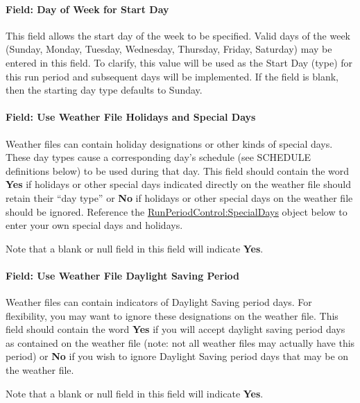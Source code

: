 \paragraph{Field: Day of Week for Start Day}\label{field-day-of-week-for-start-day-3}

This field allows the start day of the week to be specified. Valid days of the week (Sunday, Monday, Tuesday,
Wednesday, Thursday, Friday, Saturday) may be entered in this field. To clarify, this value will be used as
the Start Day (type) for this run period and subsequent days will be implemented. If the field is blank,
then the starting day type defaults to Sunday.

\paragraph{Field: Use Weather File Holidays and Special Days}\label{field-use-weather-file-holidays-and-special-days-1}

Weather files can contain holiday designations or other kinds of special days. These day types cause a
corresponding day's schedule (see SCHEDULE definitions below) to be used during that day. This field
should contain the word \textbf{Yes} if holidays or other special days indicated directly on the weather
file should retain their ``day type'' or \textbf{No} if holidays or other special days on the weather file
should be ignored. Reference the \hyperref[runperiodcontrolspecialdays]{RunPeriodControl:SpecialDays} object below to enter your own special days
and holidays.

Note that a blank or null field in this field will indicate \textbf{Yes}.

\paragraph{Field: Use Weather File Daylight Saving Period}\label{field-use-weather-file-daylight-saving-period-3}

Weather files can contain indicators of Daylight Saving period days. For flexibility, you may want to ignore
these designations on the weather file. This field should contain the word \textbf{Yes} if you will accept
daylight saving period days as contained on the weather file (note: not all weather files may actually have
this period) or \textbf{No} if you wish to ignore Daylight Saving period days that may be on the weather file.

Note that a blank or null field in this field will indicate \textbf{Yes}.

